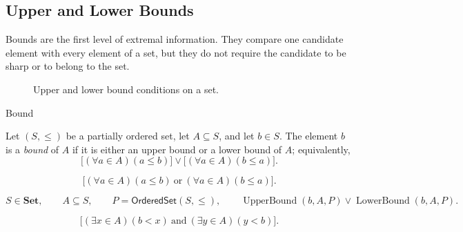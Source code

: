 \subsection{Upper and Lower Bounds}

\begin{remark*}[Exposition]
Bounds are the first level of extremal information.  They compare one
candidate element with every element of a set, but they do not
require the candidate to be sharp or to belong to the set.
\end{remark*}

\begin{figure}[htbp]
  \centering
  
  \caption{Upper and lower bound conditions on a set.}
  \label{fig:upper-lower-bound-combinations}
\end{figure}

\begin{definitionbox}{Bound}
\begin{definition}[Bound]
\label{def:bound}
Let $(S,\leq)$ be a partially ordered set, let $A\subseteq S$, and let
$b\in S$. The element $b$ is a \emph{bound} of $A$ if it is either an
upper bound or a lower bound of $A$; equivalently,
\[
  \bigl[(\forall a\in A)(a\leq b)\bigr]
  \lor
  \bigl[(\forall a\in A)(b\leq a)\bigr].
\]
\end{definition}
\end{definitionbox}

\begin{remark*}
\[
  \bigl[(\forall a\in A)(a\leq b)
  \ \text{or}\ 
  (\forall a\in A)(b\leq a)\bigr].
\]
\end{remark*}

\begin{remark*}
\[
  S\in\mathbf{Set},\qquad A\subseteq S,\qquad P=\mathsf{OrderedSet}(S,\leq),\qquad
  \operatorname{UpperBound}(b,A,P)
  \lor
  \operatorname{LowerBound}(b,A,P).
\]
\end{remark*}

\begin{remark*}
\[
  \bigl[(\exists x\in A)(b<x)
  \ \text{and}\ 
  (\exists y\in A)(y<b)\bigr].
\]
\end{remark*}

